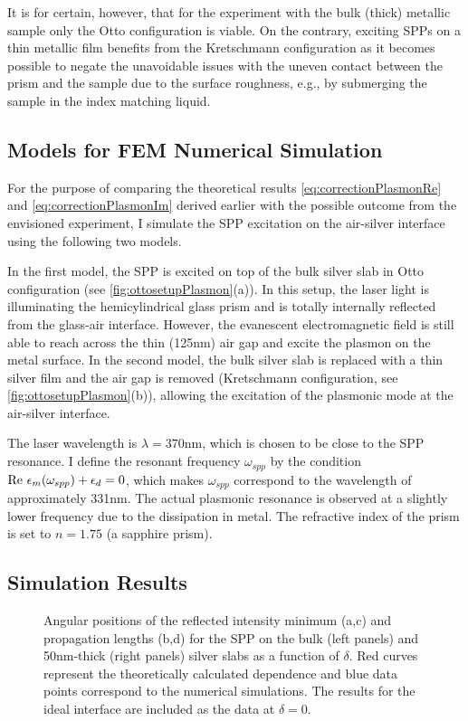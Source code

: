 It is for certain, however, that for the experiment with the bulk (thick) metallic sample only the Otto configuration is viable.
On the contrary, exciting SPPs on a thin metallic film benefits from the Kretschmann configuration as it becomes possible to negate the unavoidable issues with the uneven contact between the prism and the sample due to the surface roughness, e.g., by submerging the sample in the index matching liquid.


\subsection{Models for FEM Numerical Simulation}

For the purpose of comparing the theoretical results \cref{eq:correctionPlasmonRe} and \cref{eq:correctionPlasmonIm} derived earlier with the possible outcome from the envisioned experiment, I simulate the SPP excitation on the air-silver interface using the following two models.

In the first model, the SPP is excited on top of the bulk silver slab in Otto configuration (see \cref{fig:ottosetupPlasmon}(a)).
In this setup, the laser light is illuminating the hemicylindrical glass prism and is totally internally reflected from the glass-air interface.
However, the evanescent electromagnetic field is still able to reach across the thin (125nm) air gap and excite the plasmon on the metal surface.
%
In the second model, the bulk silver slab is replaced with a thin silver film and the air gap is removed (Kretschmann configuration, see \cref{fig:ottosetupPlasmon}(b)), allowing the excitation of the plasmonic mode at the air-silver interface.

The laser wavelength is $\lambda=370$nm, which is chosen to be close to the SPP resonance.
I define the resonant frequency $\omega_{spp}$ by the condition $\textrm{Re } \epsilon_m(\omega_{spp}) + \epsilon_d = 0$, which makes $\omega_{spp}$ correspond to the wavelength of approximately 331nm.
The actual plasmonic resonance is observed at a slightly lower frequency due to the dissipation in metal.
The refractive index of the prism is set to $n=1.75$ (a sapphire prism).


\subsection{Simulation Results}

\begin{figure}[ptb]
\caption{Angular positions of the reflected intensity minimum (a,c) and propagation lengths (b,d) for the SPP on the bulk (left panels) and 50nm-thick (right panels) silver slabs as a function of $\delta$. Red curves represent the theoretically calculated dependence and blue data points correspond to the numerical simulations. The results for the ideal interface are included as the data at $\delta=0$.}
\label{fig:minposPlasmon}
\end{figure}

